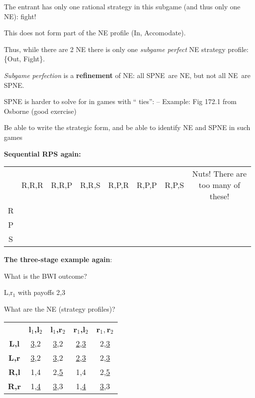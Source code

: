 The entrant has only one rational strategy in this subgame (and thus only
one NE): fight!

This does not form part of the NE profile (In, Accomodate). \

Thus, while there are 2 NE there is only one \textit{subgame perfect }NE
strategy profile: \{Out, Fight\}.



\textit{Subgame perfection }is a \textbf{refinement }of NE: all SPNE\ are
NE, but not all NE\ are SPNE.

SPNE is harder to solve for in games with \textquotedblleft
ties\textquotedblright : -- Example: Fig 172.1 from Osborne (good exercise)

Be able to write the strategic form, and be able to identify NE and SPNE in
such games


\textbf{Sequential RPS again:}
\bigskip

\begin{tabular}{cccccccc}
& R,R,R & R,R,P & R,R,S & R,P,R & R,P,P & R,P,S & Nuts! There are too many
of these! \\
R &  &  &  &  &  &  &  \\
P &  &  &  &  &  &  &  \\
S &  &  &  &  &  &  &
\end{tabular}%
\bigskip


\textbf{The three-stage example again}:


What is the BWI outcome?


L,r$_{1}$ with payoffs 2,3\bigskip




What are the NE (strategy profiles)?

\begin{tabular}{ccccc}
& \textbf{l}$_{1}$\textbf{,l}$_{2}$ & \textbf{l}$_{1}$\textbf{,r}$_{2}$ &
\textbf{r}$_{1}$\textbf{,l}$_{2}$ & \textbf{r}$_{1},$\textbf{r}$_{2}$ \\
\textbf{L,l} & \underline{3},2 & \underline{3},2 & \underline{2},\underline{3%
} & 2,\underline{3} \\
\textbf{L,r} & \underline{3},2 & \underline{3},2 & \underline{2},\underline{3%
} & 2,\underline{3} \\
\textbf{R,l} & 1,4 & 2,\underline{5} & 1,4 & 2,\underline{5} \\
\textbf{R,r} & 1,\underline{4} & \underline{3},3 & 1,\underline{4} &
\underline{3},3%
\end{tabular}

